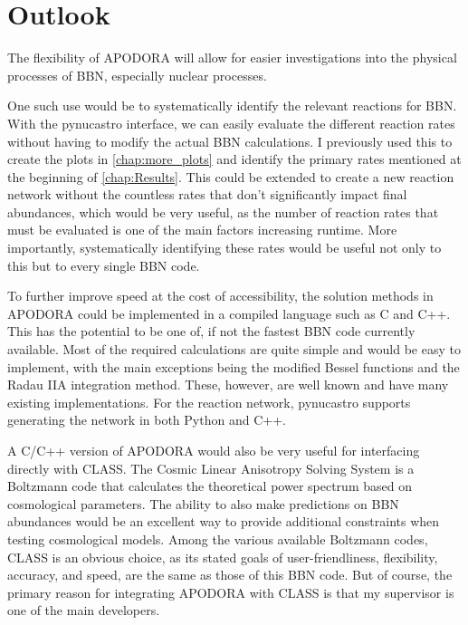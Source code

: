 \section{Outlook}

The flexibility of APODORA will allow for easier investigations into the physical processes of BBN, especially nuclear processes. 

One such use would be to systematically identify the relevant reactions for BBN. With the pynucastro interface, we can easily evaluate the different reaction rates without having to modify the actual BBN calculations. I previously used this to create the plots in \cref{chap:more_plots} and identify the primary rates mentioned at the beginning of \cref{chap:Results}. This could be extended to create a new reaction network without the countless rates that don't significantly impact final abundances, which would be very useful, as the number of reaction rates that must be evaluated is one of the main factors increasing runtime. More importantly, systematically identifying these rates would be useful not only to this but to every single BBN code. 

To further improve speed at the cost of accessibility, the solution methods in APODORA could be implemented in a compiled language such as C and C++. This has the potential to be one of, if not the fastest BBN code currently available. Most of the required calculations are quite simple and would be easy to implement, with the main exceptions being the modified Bessel functions and the Radau IIA integration method. These, however, are well known and have many existing implementations\cite{C_Bessel}. For the reaction network, pynucastro supports generating the network in both Python and C++. 

A C/C++ version of APODORA would also be very useful for interfacing directly with CLASS\cite{CLASS_Diego_Blas_2011}. The Cosmic Linear Anisotropy Solving System is a Boltzmann code that calculates the theoretical power spectrum based on cosmological parameters. The ability to also make predictions on BBN abundances would be an excellent way to provide additional constraints when testing cosmological models. Among the various available Boltzmann codes, CLASS is an obvious choice, as its stated goals of user-friendliness, flexibility, accuracy, and speed\cite{CLASS_Diego_Blas_2011}, are the same as those of this BBN code. But of course, the primary reason for integrating APODORA with CLASS is that my supervisor is one of the main developers. 

